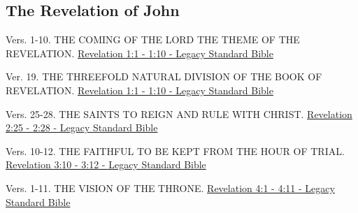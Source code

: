 \documentclass[
  ignorenonframetext,
]{beamer}
\begin{document}
\subsection{The Revelation of John}\label{the-revelation-of-john}

\begin{frame}{1}
\label{section-254}
\begin{block}{Vers. 1-10. THE COMING OF THE LORD THE THEME OF THE
REVELATION.}
\label{vers.-1-10.-the-coming-of-the-lord-the-theme-of-the-revelation.}
\href{https://read.lsbible.org/?q=rev1\%3A1-10}{Revelation 1:1 - 1:10 -
Legacy Standard Bible}
\end{block}

\begin{block}{Ver. 19. THE THREEFOLD NATURAL DIVISION OF THE BOOK OF
REVELATION.}
\label{ver.-19.-the-threefold-natural-division-of-the-book-of-revelation.}
\href{https://read.lsbible.org/?q=rev1\%3A1-10}{Revelation 1:1 - 1:10 -
Legacy Standard Bible}
\end{block}
\end{frame}

\begin{frame}{2}
\label{section-255}
\begin{block}{Vers. 25-28. THE SAINTS TO REIGN AND RULE WITH CHRIST.}
\label{vers.-25-28.-the-saints-to-reign-and-rule-with-christ.}
\href{https://read.lsbible.org/?q=rev2\%3A25-28}{Revelation 2:25 - 2:28
- Legacy Standard Bible}
\end{block}
\end{frame}

\begin{frame}{3}
\label{section-256}
\begin{block}{Vers. 10-12. THE FAITHFUL TO BE KEPT FROM THE HOUR OF
TRIAL.}
\label{vers.-10-12.-the-faithful-to-be-kept-from-the-hour-of-trial.}
\href{https://read.lsbible.org/?q=rev3\%3A10-12}{Revelation 3:10 - 3:12
- Legacy Standard Bible}
\end{block}
\end{frame}

\begin{frame}{4}
\label{section-257}
\begin{block}{Vers. 1-11. THE VISION OF THE THRONE.}
\label{vers.-1-11.-the-vision-of-the-throne.}
\href{https://read.lsbible.org/?q=rev4\%3A1-11}{Revelation 4:1 - 4:11 -
Legacy Standard Bible}
\end{block}
\end{frame}
\end{document}
